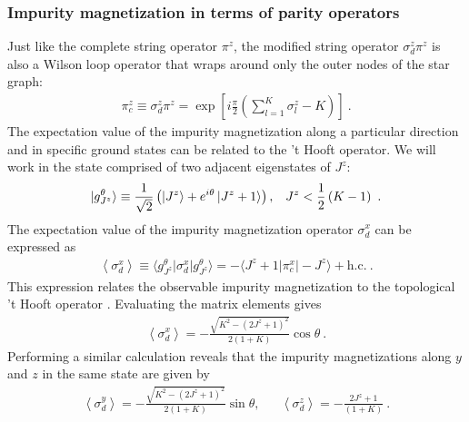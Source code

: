 \documentclass[reprint,onecolumn,prb,superscriptaddress]{revtex4-2}
\begin{document}
\subsubsection{Impurity magnetization in terms of parity operators}
Just like the complete string operator \(\pi^z\), the modified string operator \(\sigma_d^z \pi^z\) is also a Wilson loop operator that wraps around only the outer nodes of the star graph:
\begin{equation}\begin{aligned}
	\pi^z_c \equiv \sigma_d^z \pi^z = \exp\left[i \frac{\pi}{2} \left(\sum_{l=1}^K \sigma^z_l - K\right)\right] ~.
\end{aligned}\end{equation}
The expectation value of the impurity magnetization along a particular direction and in specific ground states can be related to the 't Hooft operator. We will work in the state comprised of two adjacent eigenstates of \(J^z\):
\begin{equation}\begin{aligned}
	\ket{g^\theta_{J^z}} \equiv \frac{1}{\sqrt 2}\left( \ket{J^z} + e^{i\theta}\ket{J^z+1}\right), && J^z < \frac{1}{2}\left( K-1 \right)~.
\end{aligned}\end{equation}
The expectation value of the impurity magnetization operator \(\sigma_d^x\) can be expressed as
\begin{equation}\begin{aligned}
	\left<\sigma_d^x\right> \equiv \langle g^\theta_{J^z} \vert \sigma_d^x \vert g^\theta_{J^z}\rangle = - \langle J^z + 1 \vert \pi^x_c \vert -J^z \rangle + \text{h.c.}~.
\end{aligned}\end{equation}
This expression relates the observable impurity magnetization to the topological 't Hooft operator \cite{Maric2020}. Evaluating the matrix elements gives
\begin{equation}\begin{aligned}
	\label{sigmax}
	\left<\sigma_d^x\right> = - \frac{\sqrt{K^2 - (2J^z + 1)^2}}{2(1+K)}\cos \theta~.
\end{aligned}\end{equation}
Performing a similar calculation reveals that the impurity magnetizations along \(y\) and \(z\) in the same state are given by
\begin{equation}\begin{aligned}
	\label{sigmayz}
	\left<\sigma_d^y\right> = - \frac{\sqrt{K^2 - (2J^z + 1)^2}}{2(1+K)}\sin \theta, &&\left<\sigma_d^z\right> = - \frac{2J^z + 1}{(1+K)}~.
\end{aligned}\end{equation}
\end{document}
